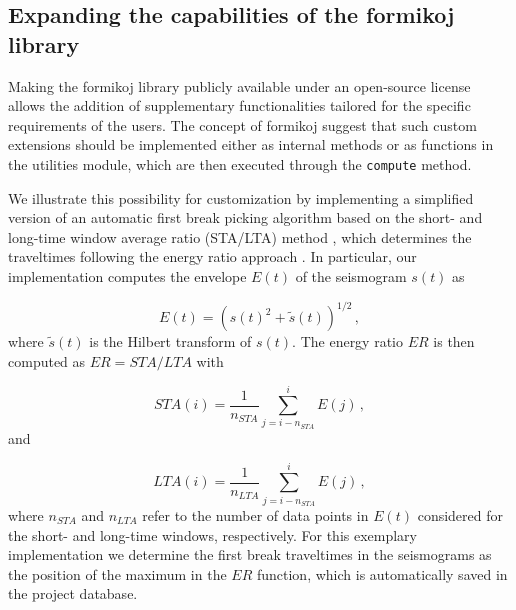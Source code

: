 \documentclass[a4paper,fleqn]{cas-sc}
\begin{document}
\subsection{Expanding the capabilities of the formikoj library}
Making the formikoj library publicly available under an open-source license 
allows the addition of supplementary functionalities tailored for the specific requirements of the users.
The concept of formikoj suggest that such custom extensions should be implemented either as internal methods or as functions in the utilities module, which are then executed through the \texttt{compute} method.

We illustrate this possibility for customization by implementing a simplified version of an automatic first break picking algorithm based on the short- and long-time window average ratio (STA/LTA) method \citep{allen1978}, which determines the traveltimes following the energy ratio approach \citep[e.g.,][]{earle1994}. In particular, our implementation computes the envelope $E\left(t\right)$ of the seismogram $s\left(t\right)$ as \citep[e.g.,][]{duan2020}

\begin{equation}
	E(t)=\left(s\left(t\right)^2+\tilde{s}\left(t\right)\right)^{1/2}\,,
	\label{eq:envelope}
\end{equation}
where $\tilde{s}\left(t\right)$ is the Hilbert transform of $s\left(t\right)$. The energy ratio $ER$ is then computed as $ER=STA/LTA$ with

\begin{equation}
	STA\left(i\right)=\frac{1}{n_{STA}}\sum_{j=i-n_{STA}}^{i}E\left(j\right)\,,
	\label{eq:sta}
\end{equation}
and 

\begin{equation}
	LTA\left(i\right)=\frac{1}{n_{LTA}}\sum_{j=i-n_{STA}}^{i}E\left(j\right)\,,
	\label{eq:lta}
\end{equation}
where $n_{STA}$ and $n_{LTA}$ refer to the number of data points in $E\left(t\right)$ considered for the short- and long-time windows, respectively. For this exemplary implementation we determine the first break traveltimes in the seismograms as the position of the maximum in the $ER$ function, which is automatically saved in the project database. 
\end{document}
